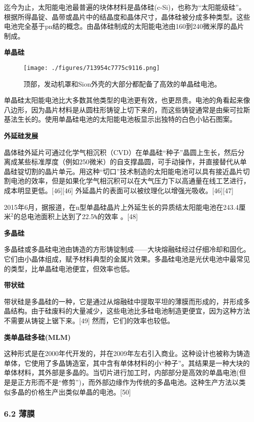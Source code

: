 迄今为止，太阳能电池最普遍的块体材料是晶体硅(c-Si)，也称为“太阳能级硅”。根据所得晶锭、晶带或晶片中的结晶度和晶体尺寸，晶体硅被分成多种类型。这些电池完全基于pn结的概念。由晶体硅制成的太阳能电池由160到240微米厚的晶片制成。

\textbf{单晶硅}

\begin{figure}[ht]
\centering
\texttt{[image: ./figures/713954c7775c9116.png]}
\caption{顶部，发动机罩和Sion外壳的大部分都配备了高效的单晶硅电池。} \label{fig_TYNDC_7}
\end{figure}

单晶硅太阳能电池比大多数其他类型的电池更有效，也更昂贵。电池的角看起来像八边形，因为晶片材料是从圆柱形铸锭上切下来的，而这些铸锭通常是由柴可拉斯基法生长的。使用单晶硅电池的太阳能电池板显示出独特的白色小钻石图案。

\textbf{外延硅发展}

晶体硅外延片可通过化学气相沉积（CVD）在单晶硅“种子”晶圆上生长，然后分离成某些标准厚度（例如250微米）的自支撑晶圆，可手动操作，并直接替代从单晶硅锭切割的晶片单元。用这种“切口”技术制造的太阳能电池可以具有接近晶片切割电池的效率，但是如果化学气相沉积可以在大气压力下以高通量在线工艺进行，成本明显更低。[46][46] 外延晶片的表面可以被纹理化以增强光吸收。[46][47]

2015年6月，据报道，在n型单晶硅晶片上外延生长的异质结太阳能电池在243.4厘米${^2}$的总电池面积上达到了22.5\verb`%`的效率 。[48]

\textbf{多晶硅}

多晶硅或多晶硅电池由铸造的方形铸锭制成——大块熔融硅经过仔细冷却和固化。它们由小晶体组成，赋予材料典型的金属片效果。多晶硅电池是光伏电池中最常见的类型，比单晶硅电池便宜，但效率也低。

\textbf{带状硅}

带状硅是多晶硅的一种，它是通过从熔融硅中提取平坦的薄膜而形成的，并形成多晶结构。由于硅废料的大量减少，这些电池比多硅电池制造更便宜，因为这种方法不需要从铸锭上锯下来。[49] 然而，它们的效率也较低。

\textbf{类单晶硅多硅(MLM)}

这种形式是在2000年代开发的，并在2009年左右引入商业。这种设计也被称为铸造单体，它使用了多晶铸造室，其中含有单体材料的小“种子”。其结果是一种大块的单体材料，其外部是多晶的。当切片进行加工时，内部部分是高效的单晶电池(但是是正方形而不是“修剪”)，而外部边缘作为传统的多晶电池。这种生产方法以类似多晶的价格生产出类似单晶的电池。[50]

\subsubsection{6.2 薄膜}

